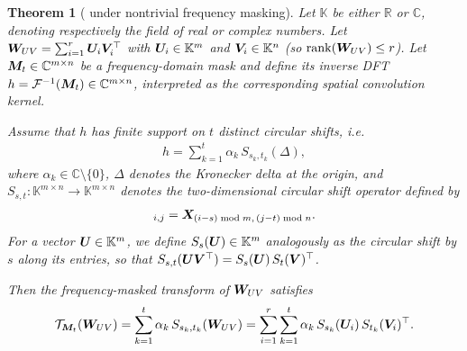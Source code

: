\documentclass{article}
\theoremstyle{plain}
\newtheorem{theorem}{Theorem}[section]
\theoremstyle{definition}
\theoremstyle{remark}
\begin{document}
\begin{theorem}[ under nontrivial frequency masking]
\label{thm:rank_increasement}
Let $\mathbb{K}$ be either $\mathbb{R}$ or $\mathbb{C}$, denoting respectively the field of real or complex numbers. 
Let ${\bm{W}}_{UV} = \sum_{i=1}^r {\bm{U}}_i {\bm{V}}_i^\top$ with ${\bm{U}}_i\in\mathbb{K}^m$ and ${\bm{V}}_i\in\mathbb{K}^n$ (so $\operatorname{rank}({\bm{W}}_{UV})\le r$). 
Let ${\bm{M}}_t\in\mathbb{C}^{m\times n}$ be a frequency-domain mask and define its inverse DFT 
$h = \mathcal{F}^{-1}({\bm{M}}_t)\in\mathbb{C}^{m\times n}$, interpreted as the corresponding spatial convolution kernel. 

Assume that $h$ has finite support on $t$ distinct circular shifts, i.e.
\begin{align}
h = \sum_{k=1}^{t} \alpha_k\, S_{s_k,t_k}(\Delta),
\end{align}
where $\alpha_k\in\mathbb{C}\setminus\{0\}$, 
$\Delta$ denotes the Kronecker delta at the origin, 
and $S_{s,t}:\mathbb{K}^{m\times n}\!\to\!\mathbb{K}^{m\times n}$ denotes the two-dimensional circular shift operator defined by
\begin{align}
  [S_{s,t}(\mX)]_{i,j} = \mX_{(i-s)\bmod m,\,(j-t)\bmod n}.
\end{align}
For a vector ${\bm{U}}\in\mathbb{K}^m$, we define $S_s({\bm{U}})\in\mathbb{K}^m$ analogously as the circular shift by $s$ along its entries, 
so that $S_{s,t}({\bm{U}} {\bm{V}}^\top) = S_s({\bm{U}})\,S_t({\bm{V}})^\top$.

Then the frequency-masked transform of ${\bm{W}}_{UV}$ satisfies
\begin{align}
\mathcal{T}_{{\bm{M}}_t}({\bm{W}}_{UV})
  = \sum_{k=1}^{t} \alpha_k\, S_{s_k,t_k}({\bm{W}}_{UV})
  = \sum_{i=1}^{r}\sum_{k=1}^{t} \alpha_k\, S_{s_k}({\bm{U}}_i)\,S_{t_k}({\bm{V}}_i)^\top.
\end{align}


\end{theorem}
\end{document}
